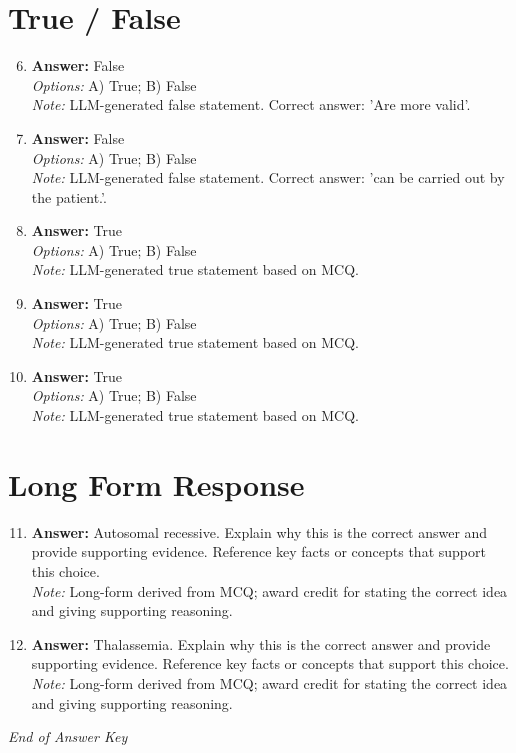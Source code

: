 \documentclass[12pt]{article}
\begin{document}
\section*{True / False}
\begin{enumerate}[label=\arabic*.]
\setcounter{enumi}{5}
\item \textbf{Answer:} False
\\ \textit{Options:} A) True; B) False
\\ \textit{Note:} LLM-generated false statement. Correct answer: 'Are more valid'.
\item \textbf{Answer:} False
\\ \textit{Options:} A) True; B) False
\\ \textit{Note:} LLM-generated false statement. Correct answer: 'can be carried out by the patient.'.
\item \textbf{Answer:} True
\\ \textit{Options:} A) True; B) False
\\ \textit{Note:} LLM-generated true statement based on MCQ.
\item \textbf{Answer:} True
\\ \textit{Options:} A) True; B) False
\\ \textit{Note:} LLM-generated true statement based on MCQ.
\item \textbf{Answer:} True
\\ \textit{Options:} A) True; B) False
\\ \textit{Note:} LLM-generated true statement based on MCQ.
\end{enumerate}

\section*{Long Form Response}
\begin{enumerate}[label=\arabic*.]
\setcounter{enumi}{10}
\item \textbf{Answer:} Autosomal recessive. Explain why this is the correct answer and provide supporting evidence. Reference key facts or concepts that support this choice.
\\ \textit{Note:} Long-form derived from MCQ; award credit for stating the correct idea and giving supporting reasoning.
\item \textbf{Answer:} Thalassemia. Explain why this is the correct answer and provide supporting evidence. Reference key facts or concepts that support this choice.
\\ \textit{Note:} Long-form derived from MCQ; award credit for stating the correct idea and giving supporting reasoning.
\end{enumerate}

\vfill
\noindent\textit{End of Answer Key}
\end{document}
